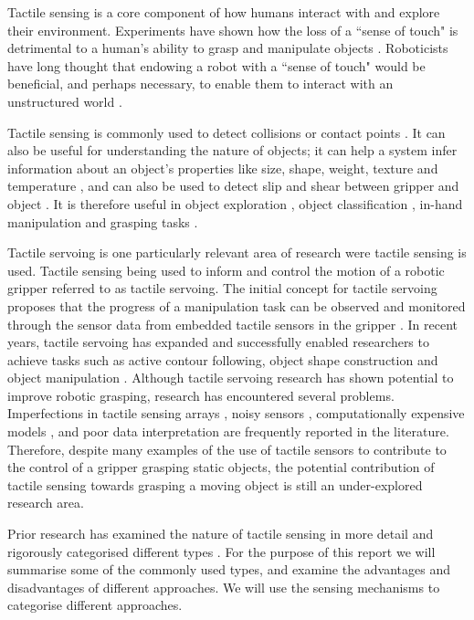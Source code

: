 Tactile sensing is a core component of how humans interact with and explore their environment. Experiments have shown how the loss of a ``sense of touch" is detrimental to a human's ability to grasp and manipulate objects \cite{HumanTactile}. Roboticists have long thought that endowing a robot with a ``sense of touch" would be beneficial, and perhaps necessary, to enable them to interact with an unstructured world \cite{iCub}. 

Tactile sensing is commonly used to detect collisions or contact points \cite{ConveyorBelt}. It can also be useful for understanding the nature of objects; it can help a system infer information about an object's properties like size, shape, weight, texture and temperature \cite{ObjectExploration,Vizzy,uSkinFingertip,InHandCP, TactileMango}, and can also be used to detect slip and shear between gripper and object \cite{First3DHall,HumanstoHumanoids,Survey}. It is therefore useful in object exploration \cite{TSiCub,BimanualExploration}, object classification \cite{James}, in-hand manipulation \cite{InHandCP} and grasping tasks \cite{Gifu}. 

Tactile servoing is one particularly relevant area of research were tactile sensing is used. Tactile sensing being used to inform and control the motion of a robotic gripper referred to as tactile servoing. The initial concept for tactile servoing proposes that the progress of a manipulation task can be observed and monitored through the sensor data from embedded tactile sensors in the gripper \cite{1994TS}. In recent years, tactile servoing has expanded and successfully enabled researchers to achieve tasks such as active contour following, object shape construction and object manipulation \cite{TSiCub,ContactControl}. Although tactile servoing research has shown potential to improve robotic grasping, research has encountered several problems. Imperfections in tactile sensing arrays \cite{TSdexterous}, noisy sensors \cite{1994TS}, computationally expensive models \cite{ContactControl}, and poor data interpretation \cite{Overview} are frequently reported in the literature.  Therefore, despite many examples of the use of tactile sensors to contribute to the control of a gripper grasping static objects, the potential contribution of tactile sensing towards grasping a moving object is still an under-explored research area.

Prior research has examined the nature of tactile sensing in more detail and rigorously categorised different types \cite{HumanstoHumanoids,TSdexterous}. For the purpose of this report we will summarise some of the commonly used types, and examine the advantages and disadvantages of different approaches. We will use the sensing mechanisms to categorise different approaches.


